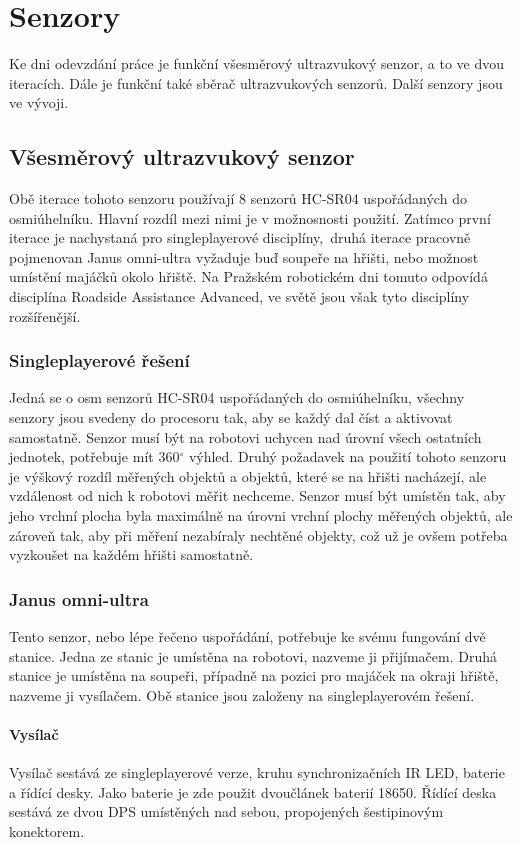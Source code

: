 \chapter{Senzory}
Ke dni odevzdání práce je funkční všesměrový ultrazvukový senzor, a to ve dvou iteracích.
Dále je funkční také sběrač ultrazvukových senzorů.
Další senzory jsou ve vývoji.

\section{Všesměrový ultrazvukový senzor}
Obě iterace tohoto senzoru používají 8 senzorů HC-SR04 uspořádaných do osmiúhelníku.
Hlavní rozdíl mezi nimi je v možnosnosti použití.
Zatímco první iterace je nachystaná pro singleplayerové disciplíny,~druhá iterace pracovně pojmenovan Janus omni-ultra vyžaduje buď soupeře na hřišti, nebo možnost umístění majáčků okolo hřiště. 
Na Pražském robotickém dni tomuto odpovídá disciplína Roadside Assistance Advanced, ve světě jsou však tyto disciplíny rozšířenější.

\subsection{Singleplayerové řešení}
Jedná se o osm senzorů HC-SR04 uspořádaných do osmiúhelníku, všechny senzory jsou svedeny do procesoru tak, aby se každý dal číst a aktivovat samostatně.
Senzor musí být na robotovi uchycen nad úrovní všech ostatních jednotek, potřebuje mít 360$^{\circ}$ výhled.
Druhý požadavek na použití tohoto senzoru je výškový rozdíl měřených objektů a objektů, které se na hřišti nacházejí, ale vzdálenost od nich k robotovi měřit nechceme.
Senzor musí být umístěn tak, aby jeho vrchní plocha byla maximálně na úrovni vrchní plochy měřených objektů, ale zároveň tak, aby při měření nezabíraly nechtěné objekty, což už je ovšem potřeba vyzkoušet na každém hřišti samostatně.

\subsection{Janus omni-ultra}
Tento senzor, nebo lépe řečeno uspořádání, potřebuje ke svému fungování dvě stanice.
Jedna ze stanic je umístěna na robotovi, nazveme ji přijímačem.
Druhá stanice je umístěna na soupeři, případně na pozici pro majáček na okraji hřiště, nazveme ji vysílačem.
Obě stanice jsou založeny na singleplayerovém řešení.

\subsubsection{Vysílač}
Vysílač sestává ze singleplayerové verze, kruhu synchronizačních IR LED, baterie a řídící desky.
Jako baterie je zde použit dvoučlánek baterií 18650.
Řídící deska sestává ze dvou DPS umístěných nad sebou, propojených šestipinovým konektorem.

